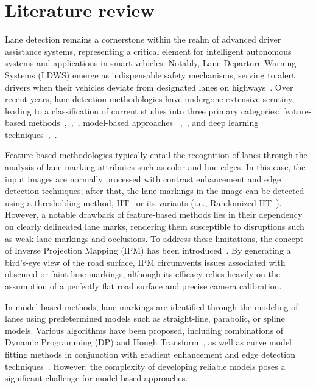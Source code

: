 

\section*{Literature review}

Lane detection remains a cornerstone within the realm of advanced driver assistance systems, representing a critical element for intelligent autonomous systems and applications in smart vehicles. Notably, Lane Departure Warning Systems (LDWS) emerge as indispensable safety mechanisms, serving to alert drivers when their vehicles deviate from designated lanes on highways~\cite{choi2016advanced}. Over recent years, lane detection methodologies have undergone extensive scrutiny, leading to a classification of current studies into three primary categories: feature-based methods~\cite{suddamalla2015novel},~\cite{sehestedt2007robust},~\cite{liu2013lane}, model-based approaches ~\cite{wang2010model},~\cite{wang2004lane}, and deep learning techniques~\cite{kim2014robust},~\cite{zou2019robust}.

Feature-based methodologies typically entail the recognition of lanes through the analysis of lane marking attributes such as color and line edges. In this case, the input images are normally processed with contrast enhancement and edge detection techniques; after that, the lane markings in the image can be detected using a thresholding method, HT~\cite{albanesi1991time} or its variants (i.e., Randomized HT~\cite{mongkonyong2018lane}). However, a notable drawback of feature-based methods lies in their dependency on clearly delineated lane marks, rendering them susceptible to disruptions such as weak lane markings and occlusions. To address these limitations, the concept of Inverse Projection Mapping (IPM) has been introduced~\cite{Borkar2012}. By generating a bird's-eye view of the road surface, IPM circumvents issues associated with obscured or faint lane markings, although its efficacy relies heavily on the assumption of a perfectly flat road surface and precise camera calibration.

In model-based methods, lane markings are identified through the modeling of lanes using predetermined models such as straight-line, parabolic, or spline models. Various algorithms have been proposed, including combinations of Dynamic Programming (DP) and Hough Transform~\cite{wang2010model}, as well as curve model fitting methods in conjunction with gradient enhancement and edge detection techniques~\cite{Yoo2013}. However, the complexity of developing reliable models poses a significant challenge for model-based approaches.


